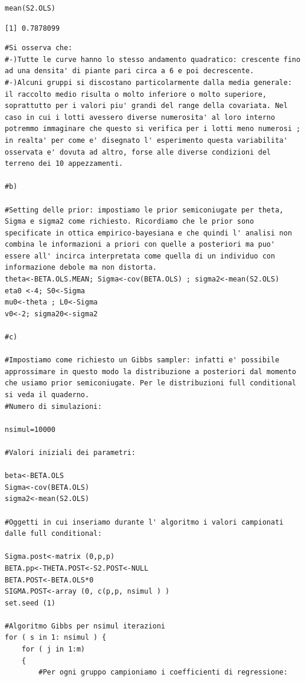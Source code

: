 \begin{lstlisting}[style=R]
mean(S2.OLS)
\end{lstlisting}

{
\color{red}
\begin{Verbatim}
[1] 0.7878099
\end{Verbatim}
}

\begin{lstlisting}[style=R]
#Si osserva che:
#-)Tutte le curve hanno lo stesso andamento quadratico: crescente fino ad una densita' di piante pari circa a 6 e poi decrescente.
#-)Alcuni gruppi si discostano particolarmente dalla media generale: il raccolto medio risulta o molto inferiore o molto superiore, soprattutto per i valori piu' grandi del range della covariata. Nel caso in cui i lotti avessero diverse numerosita' al loro interno potremmo immaginare che questo si verifica per i lotti meno numerosi ; in realta' per come e' disegnato l' esperimento questa variabilita' osservata e' dovuta ad altro, forse alle diverse condizioni del terreno dei 10 appezzamenti.

#b)

#Setting delle prior: impostiamo le prior semiconiugate per theta, Sigma e sigma2 come richiesto. Ricordiamo che le prior sono specificate in ottica empirico-bayesiana e che quindi l' analisi non combina le informazioni a priori con quelle a posteriori ma puo' essere all' incirca interpretata come quella di un individuo con informazione debole ma non distorta.
theta<-BETA.OLS.MEAN; Sigma<-cov(BETA.OLS) ; sigma2<-mean(S2.OLS)
eta0 <-4; S0<-Sigma
mu0<-theta ; L0<-Sigma
v0<-2; sigma20<-sigma2

#c)

#Impostiamo come richiesto un Gibbs sampler: infatti e' possibile approssimare in questo modo la distribuzione a posteriori dal momento che usiamo prior semiconiugate. Per le distribuzioni full conditional si veda il quaderno.
#Numero di simulazioni:

nsimul=10000

#Valori iniziali dei parametri:

beta<-BETA.OLS
Sigma<-cov(BETA.OLS)
sigma2<-mean(S2.OLS)

#Oggetti in cui inseriamo durante l' algoritmo i valori campionati dalle full conditional:

Sigma.post<-matrix (0,p,p)
BETA.pp<-THETA.POST<-S2.POST<-NULL
BETA.POST<-BETA.OLS*0
SIGMA.POST<-array (0, c(p,p, nsimul ) )
set.seed (1)

#Algoritmo Gibbs per nsimul iterazioni
for ( s in 1: nsimul ) {
    for ( j in 1:m)
    {
        #Per ogni gruppo campioniamo i coefficienti di regressione:


\end{lstlisting}
